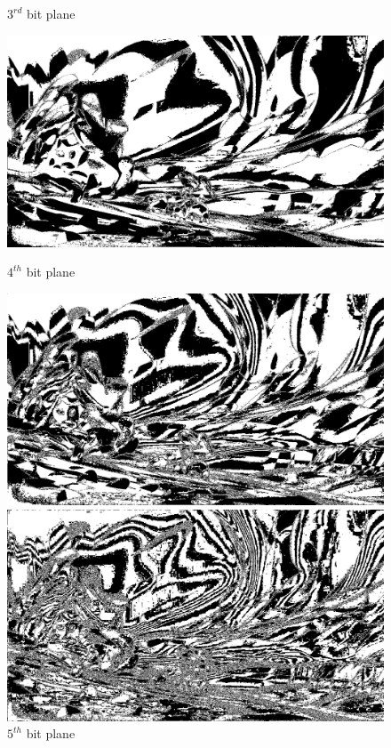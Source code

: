 \documentclass{report}
\begin{document}
\begin{figure}[H]
\begin{minipage}{0.46\linewidth}
\caption{$3^{rd}$ bit plane}
\end{minipage}
\hfill
\begin{minipage}{0.46\linewidth}
\includegraphics[width=\textwidth]{images/4.png}
\caption{$4^{th}$ bit plane}
\end{minipage}
\hfill
\begin{minipage}{0.46\linewidth}
\includegraphics[width=\textwidth]{images/5.png}
\caption{$5^{th}$ bit plane}
\end{minipage}
\hfill
\begin{minipage}{0.46\linewidth}
\includegraphics[width=\textwidth]{images/6.png}

\end{minipage}
\end{figure}
\end{document}
